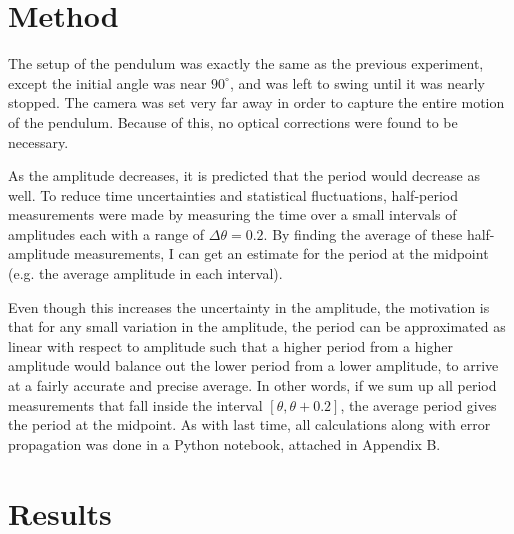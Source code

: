 \documentclass[%
 reprint,
 amsmath,amssymb
 aps,
]{revtex4-2}
\begin{document}
\section{Method}
The setup of the pendulum was exactly the same as the previous experiment, except the initial angle was near $90^\circ$, and was left to swing until it was nearly stopped. The camera was set very far away in order to capture the entire motion of the pendulum. Because of this, no optical corrections were found to be necessary.

As the amplitude decreases, it is predicted that the period would decrease as well. To reduce time uncertainties and statistical fluctuations, half-period measurements were made by measuring the time over a small intervals of amplitudes each with a range of $\Delta \theta = 0.2$. By finding the average of these half-amplitude measurements, I can get an estimate for the period at the midpoint (e.g. the average amplitude in each interval).

Even though this increases the uncertainty in the amplitude, the motivation is that for any small variation in the amplitude, the period can be approximated as linear with respect to amplitude such that a higher period from a higher amplitude would balance out the lower period from a lower amplitude, to arrive at a fairly accurate and precise average. In other words, if we sum up all period measurements that fall inside the interval $[\theta,\theta+0.2]$, the average period gives the period at the midpoint. As with last time, all calculations along with error propagation was done in a Python notebook, attached in Appendix B.
\section{Results}
\end{document}
